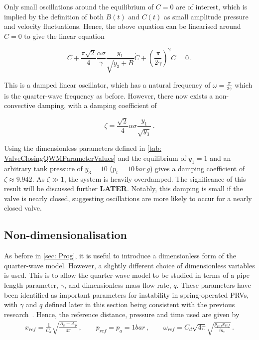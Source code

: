 Only small oscillations around the equilibrium of $C = 0$ are of interest, which is implied by the definition of both $B(t)$ and $C(t)$ as small amplitude pressure and velocity fluctuations. Hence, the above equation can be linearised around $C = 0$ to give the linear equation

\begin{equation*}
    \ddot{C} + \frac{\pi \sqrt{2}}{4} \frac{\alpha \sigma}{\gamma} \frac{y_1}{\sqrt{y_3 + B}} \dot{C} + \left( \frac{\pi}{2 \gamma} \right)^2 C = 0 \, .
\end{equation*}

This is a damped linear oscillator, which has a natural frequency of $\omega = \frac{\pi}{2 \gamma}$ which is the quarter-wave frequency as before. However, there now exists a non-convective damping, with a damping coefficient of

\begin{equation*}
    \zeta = \frac{\sqrt{2}}{4} \alpha \sigma \frac{y_1}{\sqrt{y_3}} \, .
\end{equation*}

Using the dimensionless parameters defined in \cref{tab: ValveClosingQWMParameterValues} and the equilibrium of $y_1 = 1$ and an arbitrary tank pressure of $y_3 = 10$ ($p_t = 10 \, \si{bar \, g}$) gives a damping coefficient of $\zeta \approx 9.942$. As $\zeta \gg 1$, the system is heavily overdamped. The significance of this result will be discussed further \textbf{LATER}. Notably, this damping is small if the valve is nearly closed, suggesting oscillations are more likely to occur for a nearly closed valve.

\subsection{Non-dimensionalisation}

As before in \cref{sec: Prog}, it is useful to introduce a dimensionless form of the quarter-wave model. However, a slightly different choice of dimensionless variables is used. This is to allow the quarter-wave model to be studied in terms of a pipe length parameter, $\gamma$, and dimensionless mass flow rate, $q$. These parameters have been identified as important parameters for instability in spring-operated PRVs, with $\gamma$ and $q$ defined later in this section being consistent with the previous research~\cite{Hos2016DynamicService}. Hence, the reference distance, pressure and time used are given by
~
\begin{equation*}
\begin{split}
    x_{ref} = \frac{1}{C_d} \sqrt{\frac{A_v - A_p}{4 \pi}}
    \, , \qquad
    p_{ref} = p_a = 1 \si{bar}
    \, , \qquad
    \omega_{ref} = C_d \sqrt{4 \pi} \sqrt{\frac{p_{ref} x_{ref}}{m_v}} \, .
\end{split}
\end{equation*}

